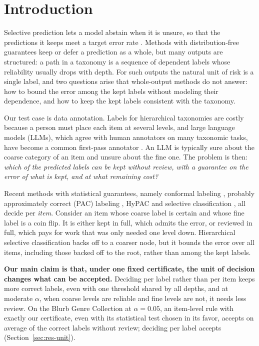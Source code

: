 \documentclass[preprint,12pt]{elsarticle}
\theoremstyle{definition}
\begin{document}
\section{Introduction}
\label{sec:intro}

Selective prediction lets a model abstain when it is unsure, so that the
predictions it keeps meet a target error rate \citep{chow1970optimum,geifman2017selective}.
Methods with distribution-free guarantees keep or defer a prediction as a whole,
but many outputs are structured: a path in a taxonomy is a sequence of dependent
labels whose reliability usually drops with depth. For such outputs
the natural unit of risk is a single label, and two questions arise that
whole-output methods do not answer: how to bound the error among the kept labels
without modeling their dependence, and how to keep the kept labels consistent
with the taxonomy.

Our test case is data annotation. Labels for hierarchical taxonomies are costly
because a person must place each item at several levels, and large language
models (LLMs), which agree with human annotators on many taxonomic tasks, have
become a common first-pass annotator
\citep{wang2021gpt3,gilardi2023chatgpt,he2024annollm,tan2024survey}. An LLM is
typically sure about the coarse category of an item and unsure about the fine
one. The problem is then: \emph{which of the predicted labels can be kept
without review, with a guarantee on the error of what is kept, and at what
remaining cost?}

Recent methods with statistical guarantees, namely conformal labeling
\citep{huang2025selective}, probably approximately correct (PAC) labeling
\citep{candes2026pac}, HyPAC \citep{zeng2026hypac} and selective classification
\citep{geifman2017selective}, all decide per \emph{item}. Consider an item whose coarse label is
certain and whose fine label is a coin flip. It is either kept in full, which
admits the error, or reviewed in full, which pays for work that was only needed
one level down. Hierarchical selective classification
\citep{goren2024hierarchical} backs off to a coarser node, but it bounds the
error over all items, including those backed off to the root, rather than among
the kept labels.

\textbf{Our main claim is that, under one fixed certificate, the unit of
decision changes what can be accepted.} Deciding per label rather than per item keeps more correct labels, even
with one threshold shared by all depths, and at moderate $\alpha$, when coarse
levels are reliable and fine levels are not, it needs less review. On the
Blurb Genre Collection at $\alpha=0.05$, an item-level rule with exactly our
certificate, even with its statistical test chosen in its favor, accepts on
average  of the correct labels without review;
deciding per label accepts 
(Section~\ref{sec:res-unit}).
\end{document}
